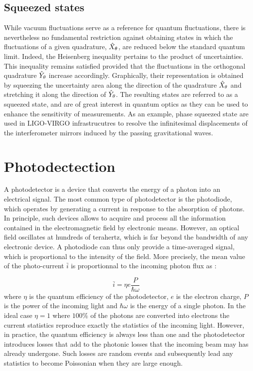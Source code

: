 \subsection{Squeezed states}
While vacuum fluctuations serve as a reference for quantum fluctuations, there is nevertheless no fundamental restriction against obtaining states in which the fluctuations of a given quadrature, $\hat{X}_{\theta}$, are reduced below the standard quantum limit. Indeed, the Heisenberg inequality pertains to the product of uncertainties.
 This inequality remains satisfied provided that the fluctuations in the orthogonal quadrature $\hat{Y}_{\theta}$ increase accordingly. Graphically, their representation is obtained by squeezing the uncertainty area along the direction of the quadrature $\hat{X}_{\theta}$ and stretching it along the direction of $\hat{Y}_{\theta}$. The resulting states are referred to as a squeezed state, and are of great interest 
 in quantum optics as they can be used to enhance the sensitivity of measurements. As an example, phase squeezed state are used in LIGO-VIRGO infrastrucutres to resolve the infinitesimal displacements of the interferometer mirrors induced by the passing gravitational waves.

\section{Photodectection}
\label{sec:photodetection}


A photodetector is a device that converts the energy of a photon into an electrical signal. The most common type of photodetector is the photodiode, which operates by generating a current in response to the absorption of photons. 
In principle, such devices allows to acquire and process all the information contained in the electromagnetic field by electronic means.
However, an optical field oscillates at hundreds of terahertz, which is far beyond the bandwidth of any electronic device. A photodiode can thus 
only provide a time-averaged signal, which is proportional to the intensity of the field. More precisely, the mean value of the photo-current $\bar{i}$ is proportionnal to the incoming photon flux as :

\begin{equation}
    \label{eq:photocurrent}
    \bar{i} = \eta e \dfrac{P}{\hbar\omega}
\end{equation}
where $\eta$ is the quantum efficiency of the photodetector, $e$ is the electron charge, $P$ is the power of the incoming light and $\hbar\omega$ is the energy of a single photon. 
In the ideal case $\eta=1$ where $100\%$ of the photons are converted into electrons the current statistics reproduce exactly the statistics of the incoming light.
However, in practice, the quantum efficiency is always less than one and the photodetector introduces losses that add to the photonic losses that the incoming beam may has already undergone.
Such losses are random events and subsequently lead any statistics to become Poissonian when they are large enough.


